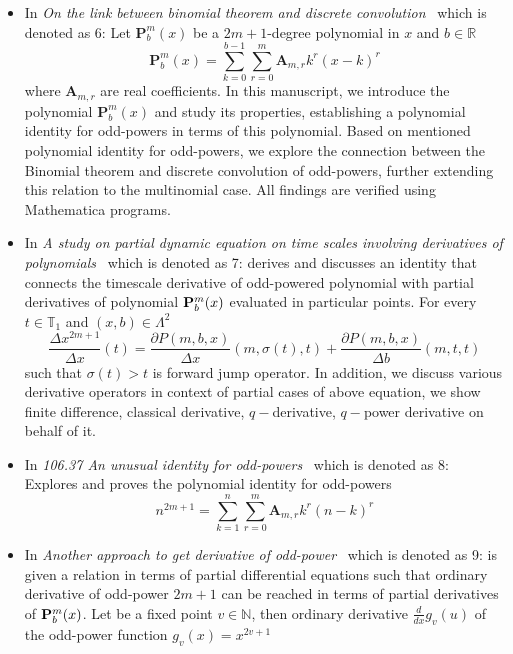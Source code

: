 \begin{itemize}
    \item In \textit{On the link between binomial theorem and discrete convolution}~\cite{kolosov2016link}
    which is denoted as 6:
    Let $\mathbf{P}^{m}_{b}(x)$ be a $2m+1$-degree polynomial in $x$ and $b \in \mathbb{R}$
    \[
        \mathbf{P}^{m}_{b}(x) = \sum_{k=0}^{b-1} \sum_{r=0}^{m} \mathbf{A}_{m,r} k^r (x-k)^r
    \]
    where $\mathbf{A}_{m,r}$ are real coefficients.
    In this manuscript, we introduce the polynomial $\mathbf{P}^{m}_{b}(x)$ and study its properties,
    establishing a polynomial identity for odd-powers in terms of this polynomial.
    Based on mentioned polynomial identity for odd-powers,
    we explore the connection between the Binomial theorem and discrete convolution of odd-powers,
    further extending this relation to the multinomial case.
    All findings are verified using Mathematica programs.
    \item In \textit{A study on partial dynamic equation on time scales involving derivatives
    of polynomials}~\cite{kolosov2016study} which is denoted as 7:
    derives and discusses an identity that connects the timescale derivative of odd-powered polynomial
    with partial derivatives of polynomial ${\mathbf{P}}\sp{m} \sb{b}(x)$ evaluated in particular points.
    For every $t\in\mathbb{T}_1$ and $(x,b) \in \Lambda^2$
    \[
        \frac{\Delta x^{2m+1}}{\Delta x}(t) =
        \frac{\partial P(m,b,x)}{\Delta x} (m, \sigma(t), t) +
        \frac{\partial P(m,b,x)}{\Delta b} (m, t, t)
    \]
    such that $\sigma(t) > t$ is forward jump operator.
    In addition, we discuss various derivative operators in context of partial cases of above equation,
    we show finite difference, classical derivative, $q-$derivative, $q-$power derivative on behalf of it.
    \item In \textit{106.37 An unusual identity for odd-powers}~\cite{kolosov2022106} which is denoted as 8:
    Explores and proves the polynomial identity for odd-powers
    \[
        n^{2m+1} = \sum_{k=1}^{n} \sum_{r=0}^{m} \mathbf{A}_{m,r} k^r (n-k)^r
    \]
    \item In \textit{Another approach to get derivative of odd-power}~\cite{kolosov2023another} which is denoted as 9:
    is given a relation in terms of partial differential equations such that
    ordinary derivative of odd-power $2m+1$ can be reached in terms of partial derivatives of ${\mathbf{P}}\sp{m} \sb{b}(x)$.
    Let be a fixed point $v\in \mathbb{N}$, then ordinary derivative $\frac{d}{dx} g_v (u)$ of the odd-power function $g_v(x) = x^{2v + 1}$

\end{itemize}
